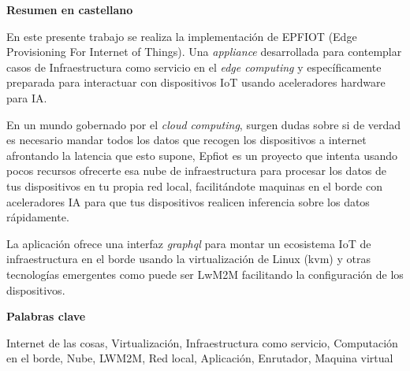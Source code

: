 
\newpage

\thispagestyle{empty}

\begin{center}

{\bf \Huge Resumen en castellano}

  \end{center}
\vspace{1cm}

En este presente trabajo se realiza la implementación de EPFIOT (Edge Provisioning For Internet of Things). Una \textit{appliance} desarrollada para contemplar casos de Infraestructura como servicio en el \textit{edge computing} y específicamente preparada para interactuar con dispositivos IoT usando aceleradores hardware para IA.

En un mundo gobernado por el \textit{cloud computing}, surgen dudas sobre si de verdad es necesario mandar todos los datos que recogen los dispositivos a internet afrontando la latencia que esto supone, Epfiot es un proyecto que intenta usando pocos recursos ofrecerte esa nube de infraestructura para procesar los datos de tus dispositivos en tu propia red local, facilitándote maquinas en el borde con aceleradores IA para que tus dispositivos realicen inferencia sobre los datos rápidamente.

La aplicación ofrece una interfaz \textit{graphql} para montar un ecosistema IoT de infraestructura en el borde usando la virtualización de Linux (kvm) y otras tecnologías emergentes como puede ser LwM2M facilitando la configuración de los dispositivos.

\vspace{1cm}


\begin{center}

{\bf \Large Palabras clave}

   \end{center}

   \vspace{0.5cm}
   
   Internet de las cosas, Virtualización, Infraestructura como servicio, Computación en el borde, Nube, LWM2M, Red local, Aplicación, Enrutador, Maquina virtual
   


